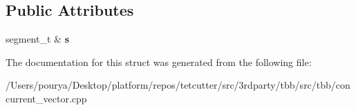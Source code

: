 \subsection*{Public Attributes}
\begin{DoxyCompactItemize}
\item 
\hypertarget{structtbb_1_1internal_1_1concurrent__vector__base__v3_1_1helper_1_1segment__not__used__predicate_aef9cc488a3150f780104c7a84f12f015}{}segment\+\_\+t \& {\bfseries s}\label{structtbb_1_1internal_1_1concurrent__vector__base__v3_1_1helper_1_1segment__not__used__predicate_aef9cc488a3150f780104c7a84f12f015}

\end{DoxyCompactItemize}


The documentation for this struct was generated from the following file\+:\begin{DoxyCompactItemize}
\item 
/\+Users/pourya/\+Desktop/platform/repos/tetcutter/src/3rdparty/tbb/src/tbb/concurrent\+\_\+vector.\+cpp\end{DoxyCompactItemize}
